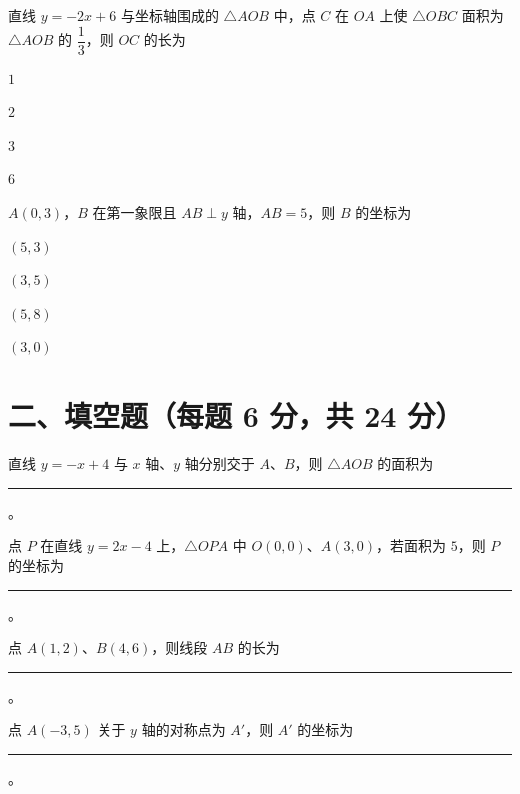 \documentclass{exam-zh}
\begin{document}
\begin{question}[points=6]
  直线 $y=-2x+6$ 与坐标轴围成的 $\triangle AOB$ 中，点 $C$ 在 $OA$ 上使 $\triangle OBC$ 面积为 $\triangle AOB$ 的 $\dfrac{1}{3}$，则 $OC$ 的长为
  \begin{choices}
    \item $1$
    \item $2$
    \item $3$
    \item $6$
  \end{choices}
\end{question}



\begin{question}[points=6]
  $A(0,3)$，$B$ 在第一象限且 $AB \perp y$ 轴，$AB=5$，则 $B$ 的坐标为
  \begin{choices}
    \item $(5, 3)$
    \item $(3, 5)$
    \item $(5, 8)$
    \item $(3, 0)$
  \end{choices}
\end{question}


\section*{二、填空题（每题 6 分，共 24 分）}



\begin{question}[points=6]
  直线 $y=-x+4$ 与 $x$ 轴、$y$ 轴分别交于 $A$、$B$，则 $\triangle AOB$ 的面积为 \rule{3cm}{0.4pt}。
  \fillin
\end{question}



\begin{question}[points=6]
  点 $P$ 在直线 $y=2x-4$ 上，$\triangle OPA$ 中 $O(0,0)$、$A(3,0)$，若面积为 $5$，则 $P$ 的坐标为 \rule{3cm}{0.4pt}。
  \fillin
\end{question}



\begin{question}[points=6]
  点 $A(1,2)$、$B(4,6)$，则线段 $AB$ 的长为 \rule{3cm}{0.4pt}。
  \fillin
\end{question}



\begin{question}[points=6]
  点 $A(-3,5)$ 关于 $y$ 轴的对称点为 $A'$，则 $A'$ 的坐标为 \rule{3cm}{0.4pt}。
  \fillin
\end{question}
\end{document}
